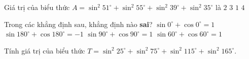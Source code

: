 \begin{ex}%
	Giá trị của biểu thức  $A=\sin^2 51^\circ+\sin^2 55^\circ+\sin^2 39^\circ+\sin^2 35^\circ$ là
	 \choice
		 {\True $2$}
		 {$3$}
		 {$1$}
		 {$4$}
\end{ex}

\begin{ex}%
	Trong các khẳng định sau, khẳng định  nào \textbf{sai}?
	 \choice
		 {$\sin 0^\circ+\cos 0^\circ=1$}
		{$\sin  180^\circ+\cos 180^\circ=-1$}
		{$\sin  90^\circ+\cos 90^\circ=1$}
		{\True $\sin 60^\circ+\cos  60^\circ=1$}
\end{ex}

\begin{bt}%
	Tính giá trị của biểu thức $T=\sin^2 25^\circ + \sin^2 75^\circ+ \sin^2 115^\circ + \sin^2 165^\circ$.
\end{bt}

